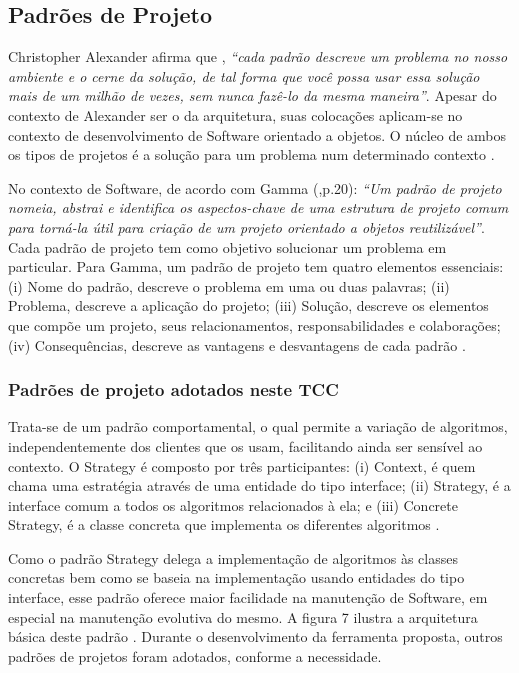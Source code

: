 \subsection{Padrões de Projeto}

Christopher Alexander afirma que , \textit{“cada padrão descreve um problema no nosso ambiente e o cerne da solução, de tal forma que você possa usar essa solução mais de um milhão de vezes, sem nunca fazê-lo da mesma maneira”}. Apesar do contexto de Alexander ser o da arquitetura, suas colocações aplicam-se no contexto de desenvolvimento de Software orientado a objetos. O núcleo de ambos os tipos de projetos é a solução para um problema num determinado contexto \cite[p.19]{gamma2000}.

No contexto de Software, de acordo com Gamma (\citeyear{gamma2000},p.20): \textit{“Um padrão de projeto nomeia, abstrai e identifica os aspectos-chave de uma estrutura de projeto comum para torná-la útil para criação de um projeto orientado a objetos reutilizável”}. Cada padrão de projeto tem como objetivo solucionar um problema em particular. Para Gamma, um padrão de projeto tem quatro elementos essenciais: (i) Nome do padrão, descreve o problema em uma ou duas palavras; (ii) Problema, descreve a aplicação do projeto; (iii) Solução, descreve os elementos que compõe um projeto, seus relacionamentos, responsabilidades e colaborações; (iv) Consequências, descreve as vantagens e desvantagens de cada padrão \cite[p.19]{gamma2000}.

\subsubsection{Padrões de projeto adotados neste TCC}


Trata-se de um padrão comportamental, o qual permite a variação de algoritmos, independentemente dos clientes que os usam, facilitando ainda ser sensível ao contexto. O Strategy é composto por três participantes: (i) Context, é quem chama uma estratégia através de uma entidade do tipo interface; (ii) Strategy, é a interface comum a todos os algoritmos relacionados à ela; e (iii) Concrete Strategy, é a classe concreta que implementa os diferentes algoritmos \cite[p.294]{gamma2000}. 

Como o padrão Strategy delega a implementação de algoritmos às classes concretas bem como se baseia na implementação usando entidades do tipo interface, esse padrão oferece maior facilidade na manutenção de Software, em especial na manutenção evolutiva do mesmo. A figura 7  ilustra a arquitetura básica deste padrão \cite[p.295]{gamma2000}. Durante o desenvolvimento da ferramenta proposta, outros padrões de projetos foram adotados, conforme a necessidade.

